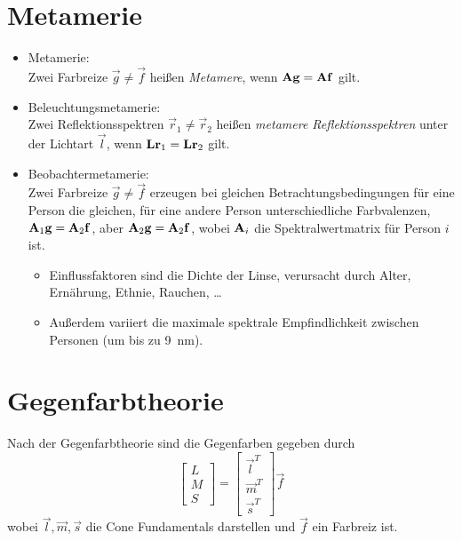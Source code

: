	\section{Metamerie}
		\begin{itemize}
			\item Metamerie: \\ Zwei Farbreize \( \vec{g} \neq \vec{f} \) heißen \emph{Metamere}, wenn \( \boldsymbol{\mathrm{A}} \boldsymbol{\mathrm{g}} = \boldsymbol{\mathrm{A}} \boldsymbol{\mathrm{f}} \) gilt.
			\item Beleuchtungsmetamerie: \\ Zwei Reflektionsspektren \( \vec{r}_1 \neq \vec{r}_2 \) heißen \emph{metamere Reflektionsspektren} unter der Lichtart \( \vec{l} \), wenn \( \boldsymbol{\mathrm{L}} \boldsymbol{\mathrm{r}}_1 = \boldsymbol{\mathrm{L}} \boldsymbol{\mathrm{r}}_2 \) gilt.
			\item Beobachtermetamerie: \\ Zwei Farbreize \( \vec{g} \neq \vec{f} \) erzeugen bei gleichen Betrachtungsbedingungen für eine Person die gleichen, für eine andere Person unterschiedliche Farbvalenzen, \dh \( \boldsymbol{\mathrm{A}}_1 \boldsymbol{\mathrm{g}} = \boldsymbol{\mathrm{A}}_2 \boldsymbol{\mathrm{f}} \), aber \( \boldsymbol{\mathrm{A}}_2 \boldsymbol{\mathrm{g}} = \boldsymbol{\mathrm{A}}_2 \boldsymbol{\mathrm{f}} \), wobei \( \boldsymbol{\mathrm{A}}_i \) die Spektralwertmatrix für Person \(i\) ist.
				\begin{itemize}
					\item Einflussfaktoren sind \zB die Dichte der Linse, verursacht durch Alter, Ernährung, Ethnie, Rauchen, \dots
					\item Außerdem variiert die maximale spektrale Empfindlichkeit zwischen Personen (um bis zu \SI{9}{\nano\meter}).
				\end{itemize}
		\end{itemize}

	\section{Gegenfarbtheorie}
		Nach der Gegenfarbtheorie sind die Gegenfarben gegeben durch
		\begin{equation*}
			\begin{bmatrix}
				L \\
				M \\
				S
			\end{bmatrix}
			=
			\begin{bmatrix}
				\vec{l}^T \\
				\vec{m}^T \\
				\vec{s}^T
			\end{bmatrix}
			\vec{f}
		\end{equation*}
		wobei \( \vec{l}, \vec{m}, \vec{s} \) die Cone Fundamentals darstellen und \(\vec{f}\) ein Farbreiz ist.

